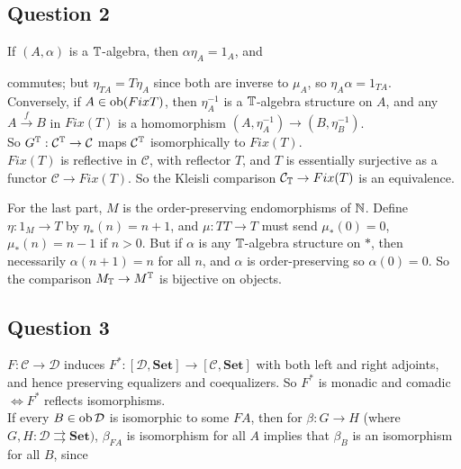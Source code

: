 \documentclass[a4paper]{article}
\begin{document}
\subsection{Question 2}
If $(A,\alpha)$ is a $\mathbb{T}$-algebra, then $\alpha\eta_A = 1_A$, and 
commutes; but $\eta_{TA} = T\eta_A$ since both are inverse to $\mu_A$, so $\eta_A \alpha = 1_{TA}$.\\
Conversely, if $A \in \operatorname{ob}(Fix T)$, then $\eta_A^{-1}$ is a $\mathbb{T}$-algebra structure on $A$, and any $A \xrightarrow{f} B$ in $Fix(T)$ is a homomorphism $(A,\eta_A^{-1}) \to (B,\eta_B^{-1})$.\\
So $G^{\mathbb{T}}: \mathcal{C}^{\mathbb{T}} \to \mathcal{C}$ maps $\mathcal{C}^{\mathbb{T}}$ isomorphically to $Fix(T)$.\\
$Fix(T)$ is reflective in $\mathcal{C}$, with reflector $T$, and $T$ is essentially surjective as a functor $\mathcal{C} \to Fix(T)$. So the Kleisli comparison $\mathcal{C}_{\mathbb{T}} \to Fix(T)$ is an equivalence.

For the last part, $M$ is the order-preserving endomorphisms of $\mathbb{N}$. Define $\eta:1_M \to T$ by $\eta_*(n) = n+1$, and $\mu:TT \to T$ must send $\mu_*(0) = 0$, $\mu_*(n) = n-1$ if $n>0$. But if $\alpha$ is any $\mathbb{T}$-algebra structure on $*$, then necessarily $\alpha(n+1) = n$ for all $n$, and $\alpha$ is order-preserving so $\alpha(0) = 0$. So the comparison $M_{\mathbb{T}} \to M^{\mathbb{T}}$ is bijective on objects.

\subsection{Question 3}
$F:\mathcal{C} \to \mathcal{D}$ induces $F^*:[\mathcal{D},\mathbf{Set}] \to [\mathcal{C},\mathbf{Set}]$ with both left and right adjoints, and hence preserving equalizers and coequalizers. So $F^*$ is monadic and comadic $\iff F^*$ reflects isomorphisms.\\
If every $B \in \operatorname{ob}\mathcal{D}$ is isomorphic to some $FA$, then for $\beta: G \to H$ (where $G,H: \mathcal{D} \rightrightarrows \mathbf{Set})$, $\beta_{FA}$ is isomorphism for all $A$ implies that $\beta_B$ is an isomorphism for all $B$, since

\end{document}
